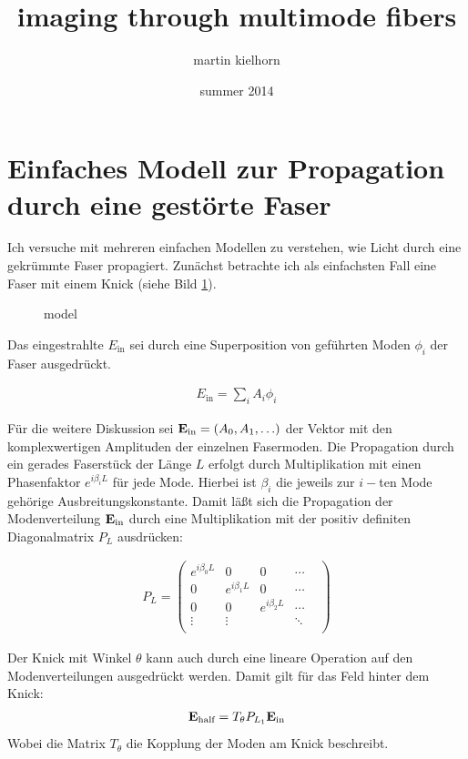 \documentclass{article}
\author{martin kielhorn}
\title{imaging through multimode fibers}
\date{summer 2014}
\begin{document}
\maketitle

\section{Einfaches Modell zur Propagation durch eine gest\"orte Faser}
Ich versuche mit mehreren einfachen Modellen zu verstehen, wie Licht
durch eine gekr\"ummte Faser propagiert. Zun\"achst betrachte ich als
einfachsten Fall eine Faser mit einem Knick (siehe Bild
\ref{fig:model}).
\begin{figure}[htbp]
  \centering
  
  \caption{model}
  \label{fig:model}
\end{figure}

Das eingestrahlte $E_\textrm{in}$ sei durch eine Superposition von
gef\"uhrten Moden $\phi_i$ der Faser ausgedr\"uckt.

\begin{align}
  E_\textrm{in} = \sum_i A_i \phi_i
\end{align}

F\"ur die weitere Diskussion sei ${\bf
  E_\textrm{in}}=(A_0,A_1,\ldots)$ der Vektor mit den komplexwertigen
Amplituden der einzelnen Fasermoden. Die Propagation durch ein gerades
Faserst\"uck der L\"ange $L$ erfolgt durch Multiplikation mit einen
Phasenfaktor $e^{i\beta_i L}$ f\"ur jede Mode. Hierbei ist $\beta_i$
die jeweils zur $i-$ten Mode geh\"orige Ausbreitungskonstante. Damit
l\"a\ss t sich die Propagation der Modenverteilung ${\bf
  E_\textrm{in}}$ durch eine Multiplikation mit der positiv definiten
Diagonalmatrix $P_L$ ausdr\"ucken:

\begin{align}
  P_L =
 \begin{pmatrix}
  e^{i\beta_0 L } & 0 & 0 & \cdots  \\
  0 & e^{i\beta_1 L } & 0 & \cdots  \\
  0 & 0 & e^{i\beta_2 L } & \cdots  \\
  \vdots  & \vdots  &  & \ddots &   \\
 \end{pmatrix}
\end{align}

Der Knick mit Winkel $\theta$ kann auch durch eine lineare Operation
auf den Modenverteilungen ausgedr\"uckt werden. Damit gilt f\"ur das
Feld hinter dem Knick:
\begin{align}
  {\bf E_\textrm{half}} = T_\theta P_{L_1} {\bf E_\textrm{in}} 
\end{align}
Wobei die Matrix $T_\theta$ die Kopplung der Moden am Knick
beschreibt.
\end{document}
